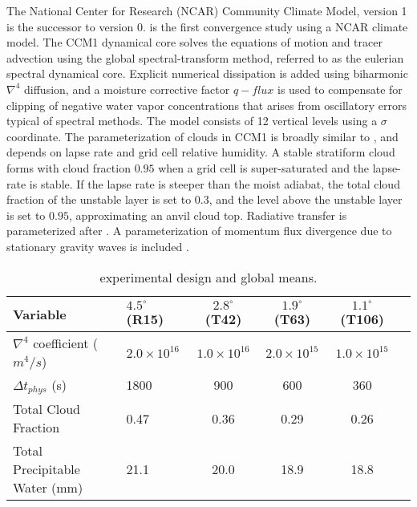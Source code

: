 The National Center for Research (NCAR) Community Climate Model, version 1 \citep[CCM1;][]{CCM1} is the successor to version 0. \cite{KW1991JGR} is the first convergence study using a NCAR climate model. The CCM1 dynamical core solves the equations of motion and tracer advection using the global spectral-transform method, referred to as the eulerian spectral dynamical core. Explicit numerical dissipation is added using biharmonic $\nabla^{4}$ diffusion, and a moisture corrective factor $q-flux$ is used to compensate for clipping of negative water vapor concentrations that arises from oscillatory errors typical of spectral methods. The model consists of 12 vertical levels using a $\sigma$ coordinate. The parameterization of clouds in CCM1 is broadly similar to \cite{METAL1965MWR}, and depends on lapse rate and grid cell relative humidity. A stable stratiform cloud forms with cloud fraction $0.95$  when a grid cell is super-saturated and the lapse-rate is stable. If the lapse rate is steeper than the moist adiabat, the total cloud fraction of the unstable layer is set to $0.3$, and the level above the unstable layer is set to $0.95$, approximating an anvil cloud top. Radiative transfer is parameterized after \cite{CCM1RAD}. A parameterization of momentum flux divergence due to stationary gravity waves is included \citep{M1987JAS}. 

 \begin{table}
 \caption{\cite{KW1991JGR} experimental design and global means.}
 \centering
 \scriptsize
 \begin{tabular}{llcccc}
 \hline
 Variable & $4.5^{\circ}$ (R15) & $2.8^{\circ}$ (T42) & $1.9^{\circ}$ (T63)  & $1.1^{\circ}$ (T106) \\
 \hline
   $\nabla^{4}$ coefficient ($m^4/s$) & $2.0 \times 10^{16}$ & $1.0 \times 10^{16}$ & $2.0 \times 10^{15}$ & $1.0 \times 10^{15}$ \\
   $\Delta t_{phys}$ (s) & 1800 & 900 & 600 & 360 \\
   Total Cloud Fraction & 0.47 & 0.36 & 0.29 & 0.26 \\
   Total Precipitable Water (mm) & 21.1 & 20.0 & 18.9 & 18.8 \\
 \hline
 \end{tabular}
 \label{tbl:table1-1}
 \end{table}

